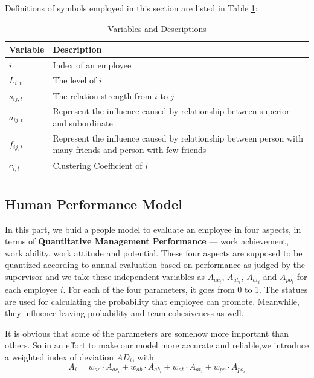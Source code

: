 \documentclass[12pt,a4paper,titlepage]{article}
\begin{document}
Definitions of symbols employed in this section are listed in Table
\ref{variable1}:
\begin{table}
  \centering
  \begin{tabular}{l p{10cm}}
  \toprule{}
  Variable & Description \\
  \midrule{}
  $i$            &Index of an employee \\
  $L_{i,t}$          &The level of $i$ \\
  $s_{ij,t}$        &The relation strength from $i$ to $j$ \\
  $a_{ij,t}$        &Represent the influence caused by relationship
                    between superior and subordinate \\
  $f_{ij,t}$        &Represent the influence caused by relationship
                    between person with many friends and person with
                    few friends \\
  $c_{i,t}$        &Clustering Coefficient of $i$ \\ \bottomrule{}
\end{tabular}
\caption{Variables and Descriptions}\label{variable1}
\end{table}

\subsection{Human Performance Model}
\label{sec:human-model}

In this part, we buid a people model to evaluate an employee in four
aspects, in terms of \textbf{Quantitative Management Performance} ---
work achievement, work ability, work attitude and potential. These
four aspects are supposed to be quantized according to annual
evaluation based on performance as judged by the supervisor and we
take these independent variables as $A_{ac_i}$, $A_{ab_i}$, $A_{at_i}$
and $A_{po_i}$ for each employee $i$. For each of the four parameters,
it goes from 0 to 1. The statues are used for calculating the
probability that employee can promote. Meanwhile, they influence
leaving probability and team cohesiveness as well.

It is obvious that some of the parameters are somehow more important
than others. So in an effort to make our model more accurate and
reliable,we introduce a weighted index of deviation $AD_i$, with
\begin{equation}
  A_i=w_{ac} \cdot A_{ac_i} + w_{ab} \cdot A_{ab_i} + w_{at} \cdot A_{at_i} +
  w_{po} \cdot A_{po_i}
\end{equation}
\end{document}
